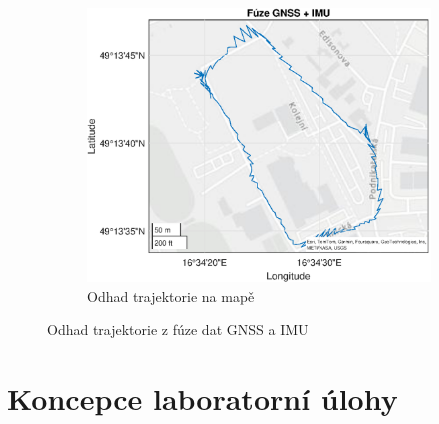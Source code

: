 \begin{figure}[h]
\begin{subfigure}[b]{0.49\textwidth}
     \end{subfigure}
     \hfill
     \centering
     \begin{subfigure}[b]{0.49\textwidth}
         \centering
         \includegraphics[width=\textwidth]{obrazky/matlab/2gnssIMU}
         \caption{Odhad trajektorie na mapě}   
         
     \end{subfigure}
     
     \caption{Odhad trajektorie z fúze dat GNSS a IMU}
     \label{fig:gnnsIMUFusion}  
\end{figure}

\chapter{Koncepce laboratorní úlohy}